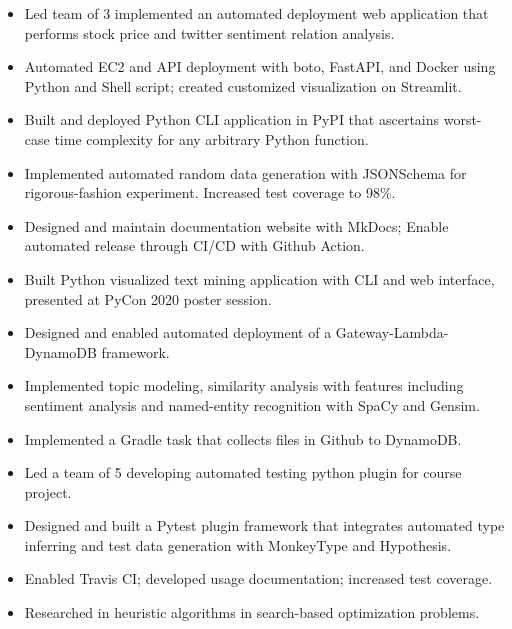 \begin{itemize}
\item Led team of 3 implemented an automated deployment web application that performs stock price and twitter sentiment relation analysis.
\item Automated EC2 and API deployment with boto, FastAPI, and Docker using Python and Shell script; created customized visualization on Streamlit.
\end{itemize}
\smallskip
{}
\begin{itemize}
\item Built and deployed Python CLI application in PyPI that ascertains worst-case time complexity for any arbitrary Python function.
\item Implemented automated random data generation with JSONSchema for rigorous-fashion experiment. Increased test coverage to 98\%.
\item Designed and maintain documentation website with MkDocs; Enable automated release through CI/CD with Github Action.
\end{itemize}
\smallskip
{}
\begin{itemize}
\item Built Python visualized text mining application with CLI and web interface, presented at PyCon 2020 poster session.
\item Designed and enabled automated deployment of a Gateway-Lambda-DynamoDB framework.
\item Implemented topic modeling, similarity analysis with features including sentiment analysis and named-entity recognition with SpaCy and Gensim.
\item Implemented a Gradle task that collects files in Github to DynamoDB.
\end{itemize}
\smallskip
{}
\begin{itemize}
\item Led a team of 5 developing automated testing python plugin for course project.
\item Designed and built a Pytest plugin framework that integrates automated type inferring and test data generation with MonkeyType and Hypothesis.
\end{itemize}
\smallskip
{}
\begin{itemize}
\item Enabled Travis CI; developed usage documentation; increased test coverage.
\item Researched in heuristic algorithms in search-based optimization problems.
\end{itemize}

